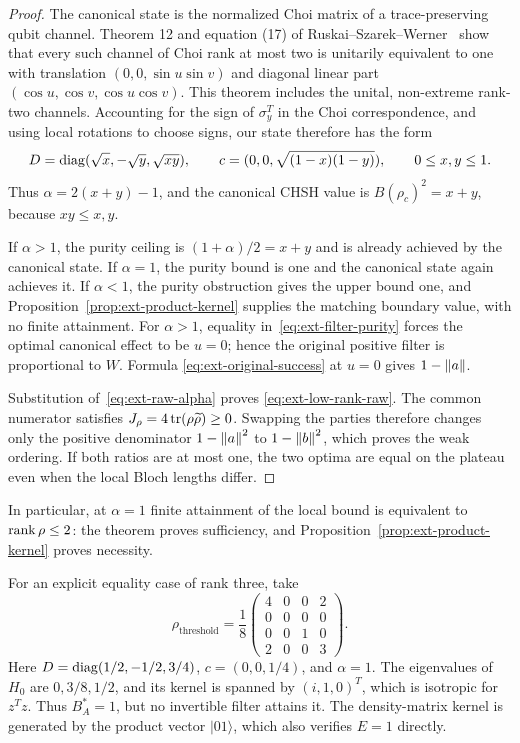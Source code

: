 \begin{proof}
The canonical state is the normalized Choi matrix of a trace-preserving
qubit channel. Theorem 12 and equation (17) of
Ruskai--Szarek--Werner~\cite{ruskai2002} show that every such channel
of Choi rank at most two is unitarily equivalent to one with
translation $(0,0,\sin u\sin v)$ and diagonal linear part
$(\cos u,\cos v,\cos u\cos v)$.
This theorem includes the unital, non-extreme rank-two channels.
Accounting for the sign of $\sigma_y^T$ in the Choi correspondence,
and using local rotations to choose signs, our state therefore has
the form
\begin{equation}
 D=\operatorname{diag}(\sqrt x,-\sqrt y,\sqrt{xy}),\qquad
 c=(0,0,\sqrt{(1-x)(1-y)}),\qquad 0\le x,y\le1.
 \label{eq:ext-rank-two-normal-form}
\end{equation}
Thus $\alpha=2(x+y)-1$, and the canonical CHSH value is
$B(\rho_c)^2=x+y$, because $xy\le x,y$.

If $\alpha>1$, the purity ceiling is $(1+\alpha)/2=x+y$ and is
already achieved by the canonical state. If $\alpha=1$, the
purity bound is one and the canonical state again achieves it.
If $\alpha<1$, the purity obstruction gives the upper bound one,
and Proposition~\ref{prop:ext-product-kernel} supplies the matching
boundary value, with no finite attainment.
For $\alpha>1$, equality in~\eqref{eq:ext-filter-purity} forces
the optimal canonical effect to be $u=0$; hence the original
positive filter is proportional to $W$. Formula
\eqref{eq:ext-original-success} at $u=0$ gives $1-\left\lVert a\right\rVert$.

Substitution of~\eqref{eq:ext-raw-alpha} proves
\eqref{eq:ext-low-rank-raw}. The common numerator satisfies
$J_\rho=4\operatorname{tr}(\rho\widetilde\rho)\ge0$.
Swapping the parties therefore changes only the positive denominator
$1-\left\lVert a\right\rVert^2$ to $1-\left\lVert b\right\rVert^2$, which proves the weak ordering.
If both ratios are at most one, the two optima are equal on the
plateau even when the local Bloch lengths differ.
\end{proof}

In particular, at $\alpha=1$ finite attainment of the local bound
is equivalent to $\operatorname{rank}\rho\le2$: the theorem proves sufficiency,
and Proposition~\ref{prop:ext-product-kernel} proves necessity.

For an explicit equality case of rank three, take
\begin{equation}
 \rho_{\mathrm{threshold}}=\frac18
 \begin{pmatrix}
 4&0&0&2\\0&0&0&0\\0&0&1&0\\2&0&0&3
 \end{pmatrix}.
 \label{eq:ext-threshold-example}
\end{equation}
Here $D=\operatorname{diag}(1/2,-1/2,3/4)$, $c=(0,0,1/4)$, and $\alpha=1$.
The eigenvalues of $H_0$ are $0,3/8,1/2$, and its kernel is spanned
by $(i,1,0)^T$, which is isotropic for $z^Tz$.
Thus $B_A^*=1$, but no invertible filter attains it.
The density-matrix kernel is generated by the product vector $|01\rangle$,
which also verifies $E=1$ directly.
